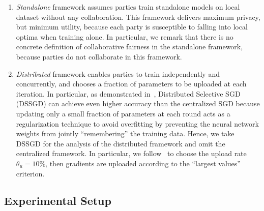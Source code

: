 \documentclass{article}
\begin{document}
\begin{enumerate}
    \item \textit{Standalone} framework assumes parties train standalone models on local dataset without any collaboration. This framework delivers maximum privacy, but minimum utility, because each party is susceptible to falling into local optima when training alone. In particular, we remark that there is no concrete definition of collaborative fairness in the standalone framework, because parties do not collaborate in this framework.
    \item \textit{Distributed} framework enables parties to train independently and concurrently, and chooses a fraction of parameters to be uploaded at each iteration. In particular, as demonstrated in~\cite{shokri2015privacy}, Distributed Selective SGD (DSSGD) can achieve even higher accuracy than the centralized SGD because updating only a small fraction of parameters at each round acts as a regularization technique to avoid overfitting by preventing the neural network weights from jointly ``remembering'' the training data. Hence, we take DSSGD for the analysis of the distributed framework and omit the centralized framework. %
In particular, we follow~\cite{shokri2015privacy} to choose the upload rate $\theta_u=10\%$, then gradients are uploaded according to the ``largest values'' criterion. %
\end{enumerate}

\subsection{Experimental Setup}
\end{document}
